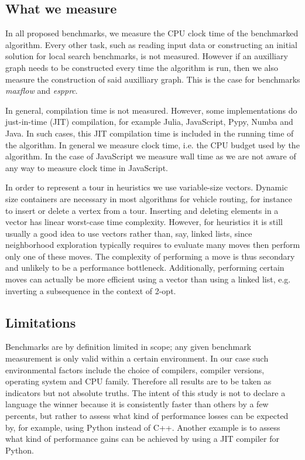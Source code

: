 \documentclass[11pt,a4paper,notitlepage]{article}
\begin{document}
\subsection{What we measure}
In all proposed benchmarks, we measure the CPU clock time of the
benchmarked algorithm. Every other task, such as reading input data or
constructing an initial solution for local search benchmarks, is not
measured. However if an auxilliary graph needs to be constructed every
time the algorithm is run, then we also measure the construction of
said auxilliary graph. This is the case for benchmarks \emph{maxflow}
and \emph{espprc}.

In general, compilation time is not measured. However, some
implementations do just-in-time (JIT) compilation, for example Julia,
JavaScript, Pypy, Numba and Java. In such cases, this JIT compilation time is
included in the running time of the algorithm. In general we measure
clock time, i.e. the CPU budget used by the algorithm. In the case of
JavaScript we measure wall time as we are not aware of any
way to measure clock time in JavaScript.

In order to represent a tour in heuristics we use variable-size
vectors. Dynamic size containers are necessary in most algorithms for 
vehicle routing, for instance to insert or delete a vertex from a
tour.
Inserting and deleting elements in a vector has linear worst-case time
complexity. However, for heuristics it is still usually a good idea to
use vectors rather than, say, linked lists, since neighborhood
exploration typically requires to evaluate many moves then perform
only one of these moves. The complexity of performing a move is thus
secondary and unlikely to be a performance bottleneck. Additionally,
performing certain moves can actually be more efficient using a
vector than using a linked list, e.g. inverting a subsequence in the
context of 2-opt.

\subsection{Limitations}
Benchmarks are by definition limited in scope; any given benchmark
measurement is only valid within a certain environment. In our case
such environmental factors include the choice of compilers, compiler
versions, operating system and CPU family. Therefore all results are
to be taken as indicators but not absolute truths. The intent of this
study is not to declare a language the winner because it is
consistently faster than others by a few percents, but rather to
assess what kind of performance losses can be expected by, for
example, using Python instead of C++. Another example is to assess what kind of
performance gains can be achieved by using a JIT compiler for Python. 
\end{document}
